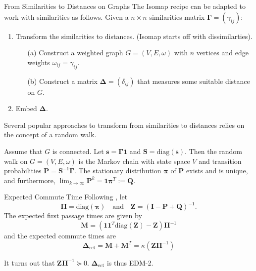 \documentclass[professionalfonts,hyperref={pdfpagelabels=false,colorlinks=true,linkcolor=blue}]{beamer}
\begin{document}
\begin{frame}{From Similarities to Distances on Graphs}
 The Isomap recipe can be adapted to work with similarities as
  follows.
  \vskip10pt Given a $n \times n$ similarities matrix $\bm{\Gamma} = (\gamma_{ij})$:
  \begin{enumerate}
  \item Transform the similarities to distances. (Isomap
    starts off with dissimilarties).
    \begin{enumerate}
    \item[(a)]Construct a weighted graph $G = (V,E,\omega)$ with $n$
      vertices and edge weights $\omega_{ij} = \gamma_{ij}$.
    \item[(b)] Construct a matrix $\bm{\Delta} = (\delta_{ij})$
      that measures some suitable distance on $G$. 
    \end{enumerate}
  \item Embed $\bm{\Delta}$. 
  \end{enumerate}
  Several popular approaches to transform from similarities to
   distances relies on the concept of a \alert{random walk}.
    
    \vskip10pt Assume that $G$ is connected. Let $\bm{s} =
    \bm{\Gamma}\bm{1}$ and $\mathbf{S} = \mathrm{diag}(\bm{s})$. Then
    the random walk on $G = (V,E,\omega)$ is the Markov chain with
    state space $V$ and transition probabilities $\mathbf{P} =
    \mathbf{S}^{-1}\bm{\Gamma}$. The stationary distribution
    $\bm{\pi}$ of $\mathbf{P}$ exists and is unique, and furthermore,
    $\lim_{k \rightarrow \infty} \mathbf{P}^{k} = \bm{1}\bm{\pi}^{T}
    := \mathbf{Q}$.
\end{frame}

\begin{frame}{Expected Commute Time}
  Following \cite{kemeny83:_finit_markov_chain}, let
  \begin{equation*}
    \bm{\Pi} = \mathrm{diag}(\bm{\pi}) \quad \text{and} \quad
    \mathbf{Z} = (\mathbf{I} - \mathbf{P} + \mathbf{Q})^{-1}.
  \end{equation*}
  The expected first passage times are given by
  \begin{equation*}
    \mathbf{M} = (\mathbf{1}\mathbf{1}^{T}\mathrm{diag}(\mathbf{Z}) -
    \mathbf{Z})\bm{\Pi}^{-1} 
  \end{equation*}
  and the expected commute times are
  \begin{equation*}
    \bm{\Delta}_{\mathrm{ect}} = \mathbf{M} + \mathbf{M}^{T} =
    \kappa(\mathbf{Z}\bm{\Pi}^{-1})
  \end{equation*}

 It turns out that $\mathbf{Z}\bm{\Pi}^{-1} \succeq
  0$. $\bm{\Delta}_{\mathrm{ect}}$ is thus \alert{EDM-2}.
\end{frame}
\end{document}
